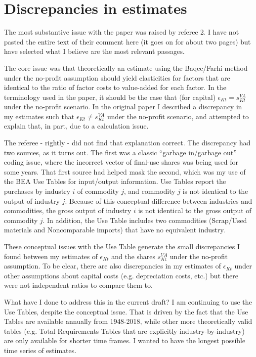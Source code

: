 \documentclass[11pt]{article}
\begin{document}
\section{Discrepancies in estimates}
The most substantive issue with the paper was raised by referee 2. I have not pasted the entire text of their comment here (it goes on for about two pages) but have selected what I believe are the most relevant passages.

The core issue was that theoretically an estimate using the Baqee/Farhi method under the no-profit assumption should yield elasticities for factors that are identical to the ratio of factor costs to value-added for each factor. In the terminology used in the paper, it should be the case that (for capital) $\epsilon_{Kt} = s_{Kt}^{VA}$ under the no-profit scenario. In the original paper I described a discrepancy in my estimates such that $\epsilon_{Kt} \neq s_{Kt}^{VA}$ under the no-profit scenario, and attempted to explain that, in part, due to a calculation issue. 

The referee - rightly - did not find that explanation correct. The discrepancy had two sources, as it turns out. The first was a classic ``garbage in/garbage out'' coding issue, where the incorrect vector of final-use shares was being used for some years. That first source had helped mask the second, which was my use of the BEA Use Tables for input/output information. Use Tables report the purchases by industry $i$ of commodity $j$, and commodity $j$ is not identical to the output of industry $j$. Because of this conceptual difference between industries and commodities, the gross output of industry $i$ is not identical to the gross output of commodity $j$. In addition, the Use Table includes two commodities (Scrap/Used materials and Noncomparable imports) that have no equivalent industry.

These conceptual issues with the Use Table generate the small discrepancies I found between my estimates of $\epsilon_{Kt}$ and the shares $s_{Kt}^{VA}$ under the no-profit assumption. To be clear, there are also discrepancies in my estimates of $\epsilon_{Kt}$ under other assumptions about capital costs (e.g. depreciation costs, etc.) but there were not independent ratios to compare them to. 

What have I done to address this in the current draft? I am continuing to use the Use Tables, despite the conceptual issue. That is driven by the fact that the Use Tables are available annually from 1948-2018, while other more theoretically valid tables (e.g. Total Requirements Tables that are explicitly industry-by-industry) are only available for shorter time frames. I wanted to have the longest possible time series of estimates. 
\end{document}
